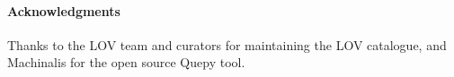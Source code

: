 \documentclass[runningheads,a4paper]{llncs}
\begin{document}
\vspace{1mm}
\paragraph{\textbf{Acknowledgments}} %
Thanks to the LOV team and curators for maintaining the LOV catalogue, and Machinalis for the open source Quepy tool. 




\end{document}
